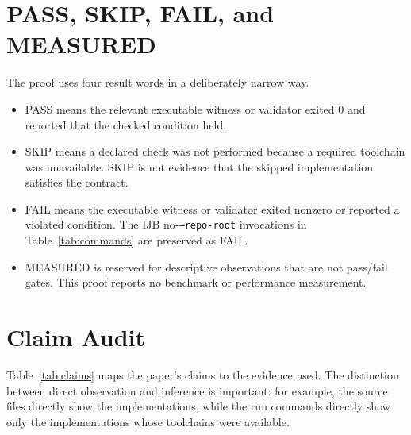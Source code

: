 \documentclass[11pt,letterpaper]{article}
\begin{document}
\section{PASS, SKIP, FAIL, and MEASURED}

The proof uses four result words in a deliberately narrow way.

\begin{itemize}
  \item PASS means the relevant executable witness or validator exited
        0 and reported that the checked condition held.
  \item SKIP means a declared check was not performed because a required
        toolchain was unavailable. SKIP is not evidence that the skipped
        implementation satisfies the contract.
  \item FAIL means the executable witness or validator exited nonzero or
        reported a violated condition. The IJB no-\texttt{--repo-root}
        invocations in Table~\ref{tab:commands} are preserved as FAIL.
  \item MEASURED is reserved for descriptive observations that are not
        pass/fail gates. This proof reports no benchmark or performance
        measurement.
\end{itemize}

\section{Claim Audit}

Table~\ref{tab:claims} maps the paper's claims to the evidence used.
The distinction between direct observation and inference is important:
for example, the source files directly show the implementations, while
the run commands directly show only the implementations whose
toolchains were available.
\end{document}

